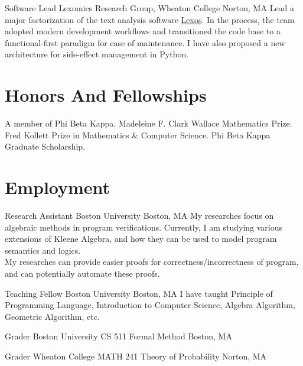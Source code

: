 \documentclass[11pt,roman]{moderncv}        %
\begin{document}
{Software Lead}
{Lexomics Research Group, Wheaton College}
{Norton, MA}{}
{
  Lead a major factorization of the text analysis software 
  \href{https://github.com/WheatonCS/Lexos}{Lexos}.
  In the process, the team adopted modern development workflows and
  transitioned the code base to a functional-first paradigm for ease of maintenance.
  I have also proposed a new architecture for 
  side-effect management in Python.
}


\section{Honors And Fellowships}
 {A member of Phi Beta Kappa.}
 {
  Madeleine F. Clark Wallace Mathematics Prize. \newline
  Fred Kollett Prize in Mathematics \& Computer Science. \newline
  Phi Beta Kappa Graduate Scholarship.
}



\section{Employment}

{Research Assistant}
{Boston University}
{Boston, MA}{}
{My researches focus on algebraic methods in program verifications.
Currently, I am studying various extensions of Kleene Algebra, 
and how they can be used to model program semantics and logics.\\
My researches can provide easier proofs for correctness/incorrectness of program,
and can potentially automate these proofs.
}

{Teaching Fellow}
{Boston University}
{Boston, MA}{}
{
  I have taught Principle of Programming Language, Introduction to Computer Science,
  Algebra Algorithm, Geometric Algorithm, etc.
}

{Grader}
{Boston University CS 511 Formal Method}
{Boston, MA}{}{}

{Grader}
{Wheaton College MATH 241 Theory of Probability}
{Norton, MA}{}{}
\end{document}

